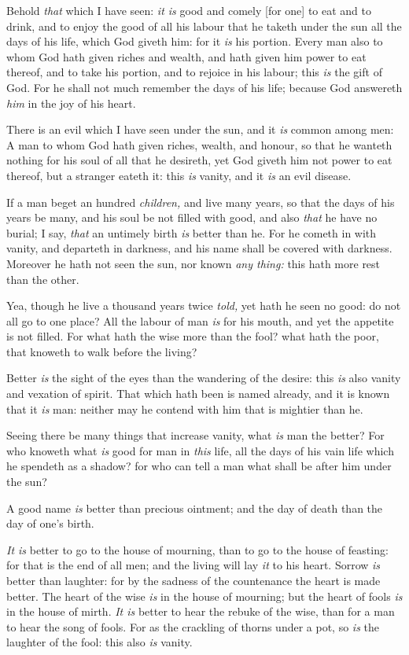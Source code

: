 \documentclass[11pt,letterpaper,oneside]{memoir}
\begin{document}
Behold \emph{that} which I have seen: \emph{it is} good and comely [for 
one] to eat and to drink, and to enjoy the good of all his labour that 
he taketh under the sun all the days of his life, which God giveth him: 
for it \emph{is} his portion. Every man also to whom God hath given 
riches and wealth, and hath given him power to eat thereof, and to take 
his portion, and to rejoice in his labour; this \emph{is} the gift of 
God. For he shall not much remember the days of his life; because God 
answereth \emph{him} in the joy of his heart. 

There is an evil which I have seen under the sun, and it \emph{is} 
common among men: A man to whom God hath given riches, wealth, and 
honour, so that he wanteth nothing for his soul of all that he desireth, 
yet God giveth him not power to eat thereof, but a stranger eateth it: 
this \emph{is} vanity, and it \emph{is} an evil disease. 

If a man beget an hundred \emph{children,} and live many years, so that 
the days of his years be many, and his soul be not filled with good, and 
also \emph{that} he have no burial; I say, \emph{that} an untimely birth 
\emph{is} better than he. For he cometh in with vanity, and departeth in 
darkness, and his name shall be covered with darkness. Moreover he hath 
not seen the sun, nor known \emph{any thing:} this hath more rest than 
the other. 

Yea, though he live a thousand years twice \emph{told,} yet hath he seen 
no good: do not all go to one place? All the labour of man \emph{is} for 
his mouth, and yet the appetite is not filled. For what hath the wise 
more than the fool? what hath the poor, that knoweth to walk before the 
living? 

Better \emph{is} the sight of the eyes than the wandering of the desire: 
this \emph{is} also vanity and vexation of spirit. That which hath been 
is named already, and it is known that it \emph{is} man: neither may he 
contend with him that is mightier than he. 

Seeing there be many things that increase vanity, what \emph{is} man the 
better? For who knoweth what \emph{is} good for man in \emph{this} life, 
all the days of his vain life which he spendeth as a shadow? for who can 
tell a man what shall be after him under the sun? 

A good name \emph{is} better than precious ointment; and the day of 
death than the day of one's birth. 

\emph{It is} better to go to the house of mourning, than to go to the 
house of feasting: for that is the end of all men; and the living will 
lay \emph{it} to his heart. Sorrow \emph{is} better than laughter: for 
by the sadness of the countenance the heart is made better. The heart of 
the wise \emph{is} in the house of mourning; but the heart of fools 
\emph{is} in the house of mirth. \emph{It is} better to hear the rebuke 
of the wise, than for a man to hear the song of fools. For as the 
crackling of thorns under a pot, so \emph{is} the laughter of the fool: 
this also \emph{is} vanity. 
\end{document}
